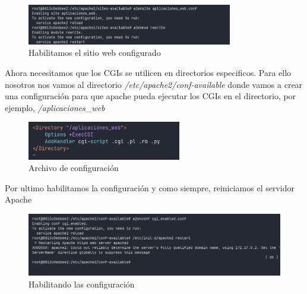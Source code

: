 \begin{figure}[H]
  \centering
  \includegraphics[width=0.8\textwidth]{img/enable_conf.png}
  \caption{Habilitamos el sitio web configurado}
\end{figure}

Ahora necesitamos que los CGIs se utilicen en directorios especificos. Para ello nosotros nos vamos al 
directorio \textit{/etc/apache2/conf-available} donde vamos a crear una configuración para que apache pueda 
ejecutar los CGIs en el directorio, por ejemplo, \textit{/aplicaciones\_web}

\begin{figure}[H]
  \centering
  \includegraphics[width=0.6\textwidth]{img/cgi_conf.png}
  \caption{Archivo de configuración}
\end{figure}

Por ultimo habilitamos la configuración y como siempre, reiniciamos el servidor Apache

\begin{figure}[H]
  \centering
  \includegraphics[width=1.0\textwidth]{img/restart2.png}
  \caption{Habilitando las configuración}
\end{figure}




